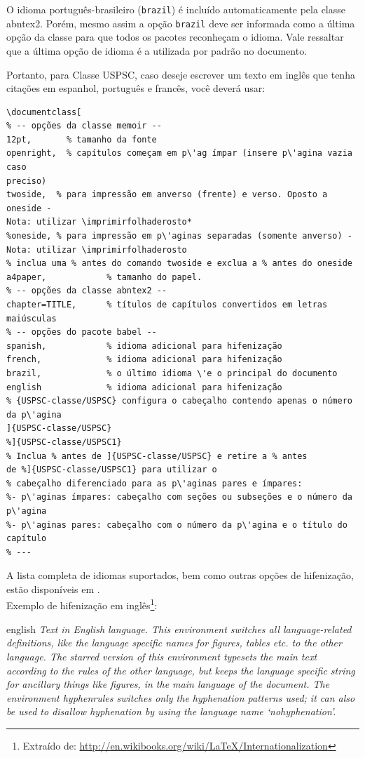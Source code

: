O idioma portugu\^es-brasileiro (\texttt{brazil}) \'e incluído automaticamente pela
classe \textsf{abntex2}. Por\'em, mesmo assim a opção \texttt{brazil} deve ser
informada como a última opção da classe para que todos os pacotes reconheçam o
idioma. Vale ressaltar que a última opção de idioma \'e a utilizada por padrão no
documento. 

Portanto, para Classe USPSC, caso deseje escrever um texto em ingl\^es que tenha
citações em espanhol, portugu\^es e franc\^es, voc\^e dever\'a usar:

\begin{verbatim}
\documentclass[
% -- opções da classe memoir --
12pt,		% tamanho da fonte
openright,	% capítulos começam em p\'ag ímpar (insere p\'agina vazia caso 
preciso)
twoside,  % para impressão em anverso (frente) e verso. Oposto a oneside - 
Nota: utilizar \imprimirfolhaderosto*
%oneside, % para impressão em p\'aginas separadas (somente anverso) -  
Nota: utilizar \imprimirfolhaderosto
% inclua uma % antes do comando twoside e exclua a % antes do oneside 
a4paper,			% tamanho do papel. 
% -- opções da classe abntex2 --
chapter=TITLE,		% títulos de capítulos convertidos em letras 
maiúsculas
% -- opções do pacote babel --
spanish,			% idioma adicional para hifenização
french,				% idioma adicional para hifenização
brazil,				% o último idioma \'e o principal do documento
english 			% idioma adicional para hifenização
% {USPSC-classe/USPSC} configura o cabeçalho contendo apenas o número 
da p\'agina
]{USPSC-classe/USPSC}
%]{USPSC-classe/USPSC1}
% Inclua % antes de ]{USPSC-classe/USPSC} e retire a % antes 
de %]{USPSC-classe/USPSC1} para utilizar o 
% cabeçalho diferenciado para as p\'aginas pares e ímpares:
%- p\'aginas ímpares: cabeçalho com seções ou subseções e o número da p\'agina
%- p\'aginas pares: cabeçalho com o número da p\'agina e o título do capítulo 
% ---
\end{verbatim}

A lista completa de idiomas suportados, bem como outras opções de hifenização,
estão disponíveis em . \\

Exemplo de hifenização em ingl\^es\footnote{Extraído de:
	\url{http://en.wikibooks.org/wiki/LaTeX/Internationalization}}:

\begin{otherlanguage*}{english}
	\textit{Text in English language. This environment switches all language-related
		definitions, like the language specific names for figures, tables etc. to the other
		language. The starred version of this environment typesets the main text
		according to the rules of the other language, but keeps the language specific
		string for ancillary things like figures, in the main language of the document.
		The environment hyphenrules switches only the hyphenation patterns used; it can
		also be used to disallow hyphenation by using the language name
		`nohyphenation'.}
\end{otherlanguage*}

